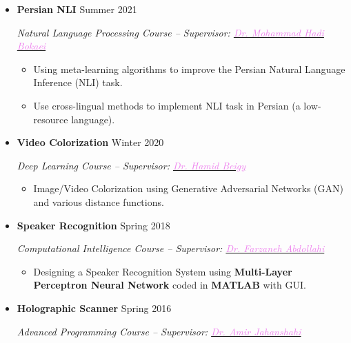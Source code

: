 \documentclass[11pt,a4paper,roman]{moderncv} %
\begin{document}
\begin{itemize}
	\item \textbf{Persian NLI} \hfill Summer 2021
	
	\emph{Natural Language Processing Course -- Supervisor: \href{http://ce.sharif.edu/~bokaei}{\textcolor{violet}{Dr. Mohammad Hadi Bokaei}}}
	
	\begin{itemize}
		\item Using meta-learning algorithms to improve the Persian Natural Language Inference (NLI) task.
		\item Use cross-lingual methods to implement NLI task in Persian (a low-resource language).
	\end{itemize}
	
	\vspace{10pt}
	
	\item \textbf{Video Colorization} \hfill Winter 2020
	
	\emph{Deep Learning Course -- Supervisor: \href{http://sharif.edu/~beigy}{\textcolor{violet}{Dr. Hamid Beigy}}}
	
	\begin{itemize}
		\item Image/Video Colorization using Generative Adversarial Networks (GAN) and various distance functions.
	\end{itemize}
	
	\vspace{10pt}
	
	\item \textbf{Speaker Recognition} \hfill Spring 2018
	
	\emph{Computational Intelligence Course -- Supervisor: \href{http://ele.aut.ac.ir/~abdollahi}{\textcolor{violet}{Dr. Farzaneh Abdollahi}}}
	
	\begin{itemize}
		\item Designing a Speaker Recognition System using \textbf{Multi-Layer Perceptron Neural Network} coded in \textbf{MATLAB} with GUI.
	\end{itemize}
	
	\vspace{10pt}
	
	\item \textbf{Holographic Scanner} \hfill Spring 2016
	
	\emph{Advanced Programming Course -- Supervisor: \href{https://mbtech.aut.ac.ir/people/amir-jahanshahi}{\textcolor{violet}{Dr. Amir Jahanshahi}}}
	

\end{itemize}
\end{document}
